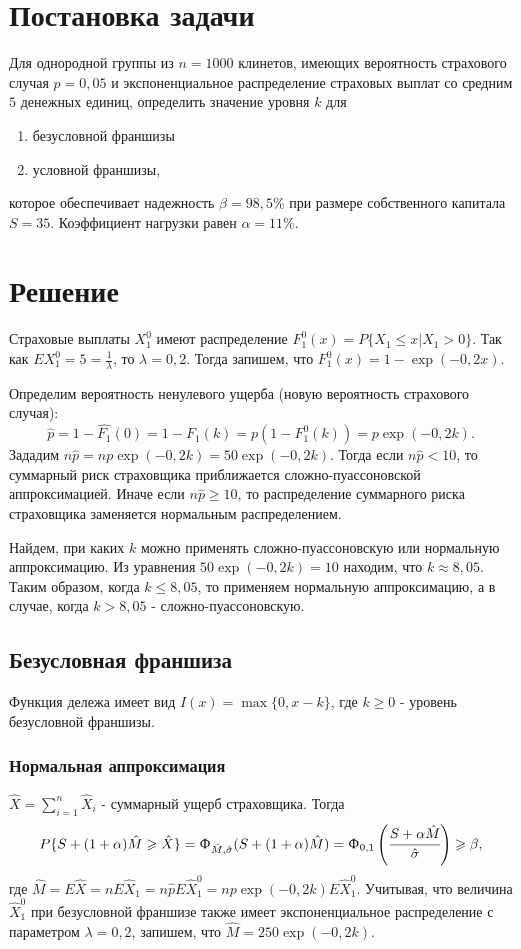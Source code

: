 \documentclass[a4paper,12pt]{article}
\begin{document}

\tableofcontents
\pagebreak

\section{Постановка задачи}
Для однородной группы из $n = 1000$ клинетов, имеющих вероятность страхового случая $p = 0,05$ и экспоненциальное распределение страховых выплат со средним $5$ денежных единиц, определить значение уровня $k$ для 
\begin{enumerate}
	\item безусловной франшизы
	\item условной франшизы,
\end{enumerate}
которое обеспечивает надежность $\beta = 98,5\%$ при размере собственного капитала $S = 35$. Коэффициент нагрузки равен $\alpha = 11\%$.

\section{Решение}
Страховые выплаты $X_1^0$ имеют распределение $F_1^0(x) = P\{X_1 \le x | X_1 > 0\}$. Так как $EX_1^0 = 5 = \frac{1}{\lambda}$, то $\lambda = 0,2$. Тогда запишем, что $F_1^0(x) = 1 - \exp(-0,2 x)$.

Определим вероятность ненулевого ущерба (новую вероятность страхового случая):
\[\hat{p} = 1 - \hat{F_1}(0) = 1 - F_1(k) = p (1 - F_1^0(k)) = p \exp(-0,2 k).\]
Зададим $n\hat{p} = np\exp(-0,2k) = 50 \exp (-0,2 k)$. Тогда если $n\hat{p} < 10$, то суммарный риск страховщика приближается сложно-пуассоновской аппроксимацией. Иначе если $n\hat{p} \ge 10$, то распределение суммарного риска страховщика заменяется нормальным распределением.

Найдем, при каких $k$ можно применять сложно-пуассоновскую или нормальную аппроксимацию. Из уравнения $50 \exp (-0,2 k) = 10$ находим, что $k \approx 8,05$. Таким образом, когда $k \le 8,05$, то применяем нормальную аппроксимацию, а в случае, когда $k > 8,05$ - сложно-пуассоновскую.

\subsection{Безусловная франшиза}
Функция дележа имеет вид $I(x) = \max\{0, x - k\}$, где $k \ge 0$ - уровень безусловной франшизы. 

\subsubsection{Нормальная аппроксимация}
$\hat{X} = \sum_{i=1}^{n} \hat{X}_i$ - суммарный ущерб страховщика. Тогда \[P\{S + (1 + \alpha)\hat{M} \ge \hat{X}\} = \Upphi_{\hat{M}, \hat{\sigma}}(S + (1 + \alpha)\hat{M}) = \Upphi_{0, 1}\left(\cfrac{S + \alpha\hat{M}}{\hat{\sigma}}\right) \ge \beta,\]
где $\hat{M} = E\hat{X} = nE\hat{X}_1 = n\hat{p}E\hat{X}_1^0 = np\exp(-0,2k)E\hat{X}_1^0$. Учитывая, что величина $\hat{X}_1^0$ при безусловной франшизе также имеет экспоненциальное распределение с параметром $\lambda = 0,2$, запишем, что $\hat{M} = 250\exp(-0,2k)$.
 
\end{document}

